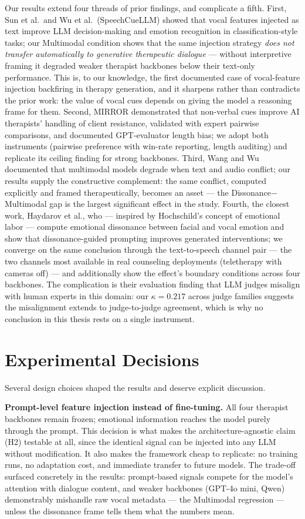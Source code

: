 Our results extend four threads of prior findings, and complicate a fifth. First, Sun et al.\ and Wu et al.\ (SpeechCueLLM) showed that vocal features injected as text improve LLM decision-making and emotion recognition in classification-style tasks; our Multimodal condition shows that the same injection strategy \emph{does not transfer automatically to generative therapeutic dialogue} --- without interpretive framing it degraded weaker therapist backbones below their text-only performance. This is, to our knowledge, the first documented case of vocal-feature injection backfiring in therapy generation, and it sharpens rather than contradicts the prior work: the value of vocal cues depends on giving the model a reasoning frame for them. Second, MIRROR demonstrated that non-verbal cues improve AI therapists' handling of client resistance, validated with expert pairwise comparisons, and documented GPT-evaluator length bias; we adopt both instruments (pairwise preference with win-rate reporting, length auditing) and replicate its ceiling finding for strong backbones. Third, Wang and Wu documented that multimodal models degrade when text and audio conflict; our results supply the constructive complement: the same conflict, computed explicitly and framed therapeutically, becomes an asset --- the Dissonance$-$Multimodal gap is the largest significant effect in the study. Fourth, the closest work, Haydarov et al., who --- inspired by Hochschild's concept of emotional labor \cite{hochschild1983managed} --- compute emotional dissonance between facial and vocal emotion and show that dissonance-guided prompting improves generated interventions; we converge on the same conclusion through the text-to-speech channel pair --- the two channels most available in real counseling deployments (teletherapy with cameras off) --- and additionally show the effect's boundary conditions across four backbones. The complication is their evaluation finding that LLM judges misalign with human experts in this domain: our $\kappa = 0.217$ across judge families suggests the misalignment extends to judge-to-judge agreement, which is why no conclusion in this thesis rests on a single instrument.

\section{Experimental Decisions}

Several design choices shaped the results and deserve explicit discussion.

\textbf{Prompt-level feature injection instead of fine-tuning.} All four therapist backbones remain frozen; emotional information reaches the model purely through the prompt. This decision is what makes the architecture-agnostic claim (H2) testable at all, since the identical signal can be injected into any LLM without modification. It also makes the framework cheap to replicate: no training runs, no adaptation cost, and immediate transfer to future models. The trade-off surfaced concretely in the results: prompt-based signals compete for the model's attention with dialogue content, and weaker backbones (GPT-4o mini, Qwen) demonstrably mishandle raw vocal metadata --- the Multimodal regression --- unless the dissonance frame tells them what the numbers mean.

